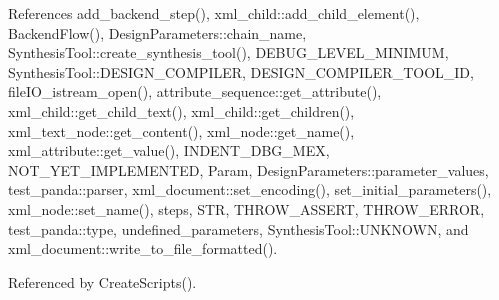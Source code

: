 References add\+\_\+backend\+\_\+step(), xml\+\_\+child\+::add\+\_\+child\+\_\+element(), Backend\+Flow(), Design\+Parameters\+::chain\+\_\+name, Synthesis\+Tool\+::create\+\_\+synthesis\+\_\+tool(), D\+E\+B\+U\+G\+\_\+\+L\+E\+V\+E\+L\+\_\+\+M\+I\+N\+I\+M\+UM, Synthesis\+Tool\+::\+D\+E\+S\+I\+G\+N\+\_\+\+C\+O\+M\+P\+I\+L\+ER, D\+E\+S\+I\+G\+N\+\_\+\+C\+O\+M\+P\+I\+L\+E\+R\+\_\+\+T\+O\+O\+L\+\_\+\+ID, file\+I\+O\+\_\+istream\+\_\+open(), attribute\+\_\+sequence\+::get\+\_\+attribute(), xml\+\_\+child\+::get\+\_\+child\+\_\+text(), xml\+\_\+child\+::get\+\_\+children(), xml\+\_\+text\+\_\+node\+::get\+\_\+content(), xml\+\_\+node\+::get\+\_\+name(), xml\+\_\+attribute\+::get\+\_\+value(), I\+N\+D\+E\+N\+T\+\_\+\+D\+B\+G\+\_\+\+M\+EX, N\+O\+T\+\_\+\+Y\+E\+T\+\_\+\+I\+M\+P\+L\+E\+M\+E\+N\+T\+ED, Param, Design\+Parameters\+::parameter\+\_\+values, test\+\_\+panda\+::parser, xml\+\_\+document\+::set\+\_\+encoding(), set\+\_\+initial\+\_\+parameters(), xml\+\_\+node\+::set\+\_\+name(), steps, S\+TR, T\+H\+R\+O\+W\+\_\+\+A\+S\+S\+E\+RT, T\+H\+R\+O\+W\+\_\+\+E\+R\+R\+OR, test\+\_\+panda\+::type, undefined\+\_\+parameters, Synthesis\+Tool\+::\+U\+N\+K\+N\+O\+WN, and xml\+\_\+document\+::write\+\_\+to\+\_\+file\+\_\+formatted().



Referenced by Create\+Scripts().

